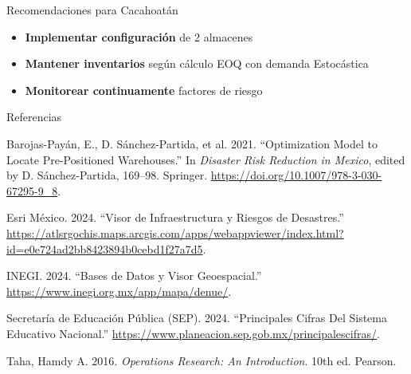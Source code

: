 \documentclass[
  ignorenonframetext,
]{beamer}
\newlength{\cslhangindent}
\newenvironment{CSLReferences}[2] %
 {\begin{list}{}{%
  \setlength{\itemindent}{0pt}
  \setlength{\leftmargin}{0pt}
  \setlength{\parsep}{0pt}
  \ifodd #1
   \setlength{\leftmargin}{\cslhangindent}
   \setlength{\itemindent}{-1\cslhangindent}
  \fi
  \setlength{\itemsep}{#2\baselineskip}}}
 {\end{list}}
\providecommand{\tightlist}{%
  \setlength{\itemsep}{0pt}\setlength{\parskip}{0pt}}
\begin{document}
\begin{frame}{Recomendaciones para Cacahoatán}
\label{recomendaciones-para-cacahoatuxe1n}
\begin{itemize}
\tightlist
\item
  \textbf{Implementar configuración} de 2 almacenes
\item
  \textbf{Mantener inventarios} según cálculo EOQ con demanda
  Estocástica
\item
  \textbf{Monitorear continuamente} factores de riesgo
\end{itemize}
\end{frame}

\begin{frame}{Referencias}
\label{referencias}
\label{refs}
\begin{CSLReferences}{1}{0}
Barojas-Payán, E., D. Sánchez-Partida, et al. 2021. {``Optimization
Model to Locate Pre-Positioned Warehouses.''} In \emph{Disaster Risk
Reduction in Mexico}, edited by D. Sánchez-Partida, 169--98. Springer.
\url{https://doi.org/10.1007/978-3-030-67295-9_8}.

Esri México. 2024. {``Visor de Infraestructura y Riesgos de
Desastres.''}
\url{https://atlsrgochis.maps.arcgis.com/apps/webappviewer/index.html?id=e0e724ad2bb8423894b0cebd1f27a7d5}.

INEGI. 2024. {``Bases de Datos y Visor Geoespacial.''}
\url{https://www.inegi.org.mx/app/mapa/denue/}.

Secretaría de Educación Pública (SEP). 2024. {``Principales Cifras Del
Sistema Educativo Nacional.''}
\url{https://www.planeacion.sep.gob.mx/principalescifras/}.

Taha, Hamdy A. 2016. \emph{Operations Research: An Introduction}. 10th
ed. Pearson.

\end{CSLReferences}
\end{frame}
\end{document}
